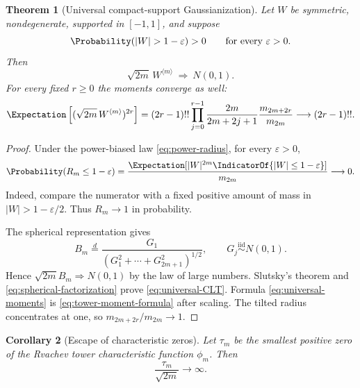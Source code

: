 \documentclass[11pt,oneside]{article}
\newtheorem{theorem}{Theorem}[section]
\newtheorem{corollary}[theorem]{Corollary}
\theoremstyle{definition}
\theoremstyle{remark}
\begin{document}
\begin{theorem}[Universal compact-support Gaussianization]
\label{thm:universal-Gaussian}
Let $W$ be symmetric, nondegenerate, supported in $[-1,1]$, and suppose
\begin{equation}
 \Probability(|W|>1-\varepsilon)>0
 \qquad\text{for every }\varepsilon>0.              \label{eq:endpoint-reached}
\end{equation}
Then
\begin{equation}
 \sqrt{2m}\,W^{\langle m\rangle}
 \ \Longrightarrow\ N(0,1).                       \label{eq:universal-CLT}
\end{equation}
For every fixed $r\ge0$ the moments converge as well:
\begin{equation}
 \Expectation\left[(\sqrt{2m}\,W^{\langle m\rangle})^{2r}\right]
 =(2r-1)!!
  \prod_{j=0}^{r-1}\frac{2m}{2m+2j+1}
  \frac{m_{2m+2r}}{m_{2m}}
 \longrightarrow(2r-1)!!.                          \label{eq:universal-moments}
\end{equation}
\end{theorem}

\begin{proof}
Under the power-biased law \eqref{eq:power-radius}, for every
$\varepsilon>0$,
\[
 \Probability(R_m\le1-\varepsilon)
 =\frac{\Expectation[|W|^{2m}\IndicatorOf{|W|\le1-\varepsilon}]}{m_{2m}}
 \longrightarrow0.
\]
Indeed, compare the numerator with a fixed positive amount of mass in
$|W|>1-\varepsilon/2$.  Thus $R_m\to1$ in probability.

The spherical representation gives
\[
 B_m\stackrel d=
 \frac{G_1}{(G_1^2+\cdots+G_{2m+1}^2)^{1/2}},
\qquad G_j\stackrel{\mathrm{iid}}\sim N(0,1).
\]
Hence $\sqrt{2m}B_m\Rightarrow N(0,1)$ by the law of large numbers.  Slutsky's
theorem and \eqref{eq:spherical-factorization} prove
\eqref{eq:universal-CLT}.  Formula \eqref{eq:universal-moments} is
\eqref{eq:tower-moment-formula} after scaling.  The tilted radius concentrates
at one, so $m_{2m+2r}/m_{2m}\to1$.
\end{proof}

\begin{corollary}[Escape of characteristic zeros]
Let $\tau_m$ be the smallest positive zero of the Rvachev tower characteristic
function $\phi_m$.  Then
\begin{equation}
 \frac{\tau_m}{\sqrt{2m}}\longrightarrow\infty.     \label{eq:zero-escape}
\end{equation}
\end{corollary}
\end{document}
